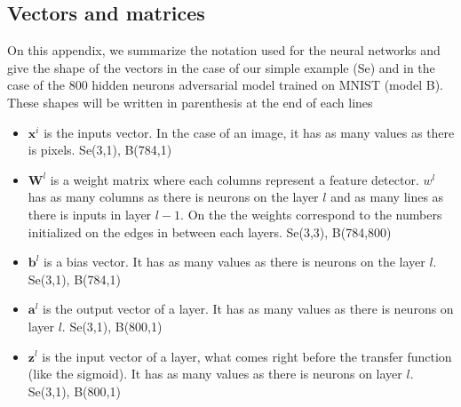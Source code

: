 \begin{appendices}
	\chapter{Vectors and matrices}
	\label{sec:vectors_and_matrices}
		On this appendix, we summarize the notation used for the neural networks and give the shape of the vectors in the case of our simple example (Se) and in the case of the 800 hidden neurons adversarial model trained on MNIST (model B). These shapes will be written in parenthesis at the end of each lines
		\begin{itemize}
			\item $\boldsymbol{x}^i$ is the inputs vector. In the case of an image, it has as many values as there is pixels. Se(3,1), B(784,1)
			\item $\boldsymbol{W}^l$ is a weight matrix where each columns represent a feature detector. $w^l$ has as many columns as there is neurons on the layer $l$ and as many lines as there is inputs in layer $l-1$. On the  the weights correspond to the numbers initialized on the edges in between each layers. Se(3,3), B(784,800)
			\item $\boldsymbol{b}^l$ is a bias vector. It has as many values as there is neurons on the layer $l$. Se(3,1), B(784,1)
			\item $\boldsymbol{a}^l$ is the output vector of a layer. It has as many values as there is neurons on layer $l$. Se(3,1), B(800,1)
			\item $\boldsymbol{z}^l$ is the input vector of a layer, what comes right before the transfer function (like the sigmoid). It has as many values as there is neurons on layer $l$. Se(3,1), B(800,1)
		\end{itemize}
	




\end{appendices}
		

